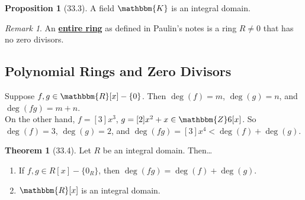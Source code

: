 \documentclass{article}
\newcommand{\Z}{\mathbbm{Z}}
\newcommand{\R}{\mathbbm{R}}
\newcommand{\define}[1]{\textbf{\underline{#1}}}
\theoremstyle{definition}
\newtheorem*{thm}{Theorem}
\newtheorem*{prop}{Proposition}
\theoremstyle{remark}
\newtheorem*{rmk}{Remark}
\newcommand{\K}{\mathbbm{K}}
\begin{document}
{        \begin{prop}[33.3]
            A field $\K$ is an integral domain.
        \end{prop}
        
        \begin{rmk}
            An \define{entire ring} as defined in Paulin's notes is a ring $R\neq 0$ that has no zero divisors.
        \end{rmk}
        
        \subsection*{Polynomial Rings and Zero Divisors}{
            Suppose $f,g \in \R[x]-\{0\}$. Then $\deg(f)=m$, $\deg(g)=n$, and $\deg(fg)=m+n$.\\
            On the other hand, $f=[3]x^3$, $g=[2]x^2+x \in \Z6[x]$. So $\deg(f)=3$, $\deg(g)=2$, and $\deg(fg)=[3]x^4 < \deg(f)+\deg(g)$.
            
            \begin{thm}[33.4]
                Let $R$ be an integral domain. Then\ldots
                \begin{enumerate}
                    \item If $f,g \in R[x]-\{0_R\}$, then $\deg (fg)=\deg(f)+\deg(g)$.
                    \item $\R[x]$ is an integral domain.
                \end{enumerate}
            \end{thm}
        }
    }
    
\end{document}
